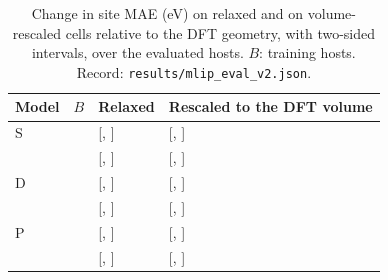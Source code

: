 \begin{table}[H]
\caption{Change in site MAE (eV) on relaxed and on volume-rescaled cells relative to the DFT geometry, with two-sided \pctci{} intervals, over the \numNetGeomEvaluatedHosts{} evaluated hosts. $B$: training hosts. Record: \texttt{results/mlip\_eval\_v2.json}.\label{tab:app_geometry}}
\centering
\small
\begin{tabular}{lrll}
\toprule
Model & $B$ & Relaxed & Rescaled to the DFT volume \\
\midrule
S & \numCfgBudgetsHostsItemFour{} & \numNetGeomDeltaMaeSTwoHundredRelaxed{} [\numNetGeomDeltaMaeSTwoHundredRelaxedLo{}, \numNetGeomDeltaMaeSTwoHundredRelaxedHi{}] & \numNetGeomDeltaMaeSTwoHundredRescaled{} [\numNetGeomDeltaMaeSTwoHundredRescaledLo{}, \numNetGeomDeltaMaeSTwoHundredRescaledHi{}] \\
 & \numCfgBudgetsMax{} & \numNetGeomDeltaMaeSSixHundredFiftyFourRelaxed{} [\numNetGeomDeltaMaeSSixHundredFiftyFourRelaxedLo{}, \numNetGeomDeltaMaeSSixHundredFiftyFourRelaxedHi{}] & \numNetGeomDeltaMaeSSixHundredFiftyFourRescaled{} [\numNetGeomDeltaMaeSSixHundredFiftyFourRescaledLo{}, \numNetGeomDeltaMaeSSixHundredFiftyFourRescaledHi{}] \\
\addlinespace
D & \numCfgBudgetsHostsItemFour{} & \numNetGeomDeltaMaeDTwoHundredRelaxed{} [\numNetGeomDeltaMaeDTwoHundredRelaxedLo{}, \numNetGeomDeltaMaeDTwoHundredRelaxedHi{}] & \numNetGeomDeltaMaeDTwoHundredRescaled{} [\numNetGeomDeltaMaeDTwoHundredRescaledLo{}, \numNetGeomDeltaMaeDTwoHundredRescaledHi{}] \\
 & \numCfgBudgetsMax{} & \numNetGeomDeltaMaeDSixHundredFiftyFourRelaxed{} [\numNetGeomDeltaMaeDSixHundredFiftyFourRelaxedLo{}, \numNetGeomDeltaMaeDSixHundredFiftyFourRelaxedHi{}] & \numNetGeomDeltaMaeDSixHundredFiftyFourRescaled{} [\numNetGeomDeltaMaeDSixHundredFiftyFourRescaledLo{}, \numNetGeomDeltaMaeDSixHundredFiftyFourRescaledHi{}] \\
\addlinespace
P & \numCfgBudgetsHostsItemFour{} & \numNetGeomDeltaMaePTwoHundredRelaxed{} [\numNetGeomDeltaMaePTwoHundredRelaxedLo{}, \numNetGeomDeltaMaePTwoHundredRelaxedHi{}] & \numNetGeomDeltaMaePTwoHundredRescaled{} [\numNetGeomDeltaMaePTwoHundredRescaledLo{}, \numNetGeomDeltaMaePTwoHundredRescaledHi{}] \\
 & \numCfgBudgetsMax{} & \numNetGeomDeltaMaePSixHundredFiftyFourRelaxed{} [\numNetGeomDeltaMaePSixHundredFiftyFourRelaxedLo{}, \numNetGeomDeltaMaePSixHundredFiftyFourRelaxedHi{}] & \numNetGeomDeltaMaePSixHundredFiftyFourRescaled{} [\numNetGeomDeltaMaePSixHundredFiftyFourRescaledLo{}, \numNetGeomDeltaMaePSixHundredFiftyFourRescaledHi{}] \\
\bottomrule
\end{tabular}
\end{table}
